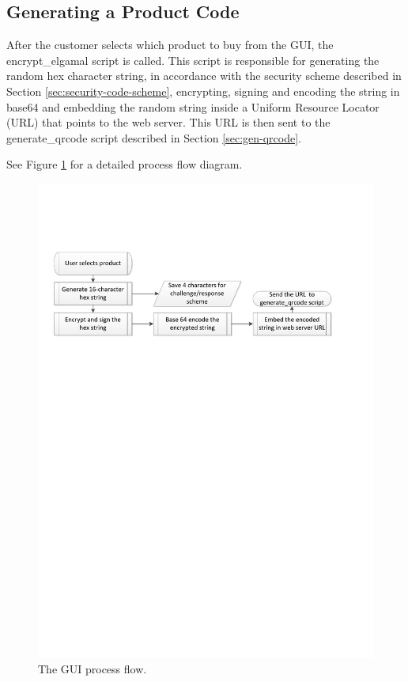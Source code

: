 \subsection{Generating a Product Code}

After the customer selects which product to buy from the GUI, the
encrypt\_elgamal script is called. This script is responsible for generating the
random hex character string, in accordance with the security scheme described in
Section \ref{sec:security-code-scheme}, encrypting, signing and encoding the
string in base64 and embedding the random string inside a Uniform
Resource Locator (URL) that points to the web server. This URL is then sent to
the generate\_qrcode script described in Section \ref{sec:gen-qrcode}.

See Figure \ref{fig:gen-prod-code-processflow} for a detailed process flow
diagram.

\begin{figure}
 \centering 
 \includegraphics[clip=true, trim = 0 550 50 100, scale=0.7]{gui_processflow}
 \caption{The GUI process flow.}
 \label{fig:gen-prod-code-processflow}
\end{figure}

